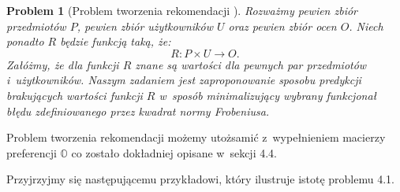 \documentclass[12pt,a4paper]{report}
\newtheorem{problem}{Problem}[chapter]
\newcommand{\setUzytkownicy}{\mathit{U}}
\newcommand{\setPrzedmioty}{\mathit{P}}
\newcommand{\setOceny}{\mathit{O}}
\begin{document}
\begin{problem}[Problem tworzenia rekomendacji {\citep[Sec 1.3]{kidzinski}}]
Rozważmy pewien zbiór przedmiotów $\setPrzedmioty$, pewien zbiór użytkowników $\setUzytkownicy$ oraz pewien zbiór ocen $\setOceny$. Niech ponadto $R$ będzie funkcją taką, że:
$$ 
R: \setPrzedmioty \times \setUzytkownicy \to \setOceny .
$$
Załóżmy, że dla funkcji $R$ znane są wartości dla pewnych par przedmiotów i~użytkowników. Naszym zadaniem jest zaproponowanie sposobu predykcji brakujących wartości funkcji $R$ w~sposób minimalizujący wybrany funkcjonał błędu zdefiniowanego przez kwadrat normy Frobeniusa. 
\end{problem}

Problem tworzenia rekomendacji możemy utożsamić z~wypełnieniem macierzy preferencji $\mathbb{O}$ co zostało dokładniej opisane w~sekcji 4.4.
\bigskip

Przyjrzyjmy się następującemu przykładowi, który ilustruje istotę problemu 4.1.
\end{document}
